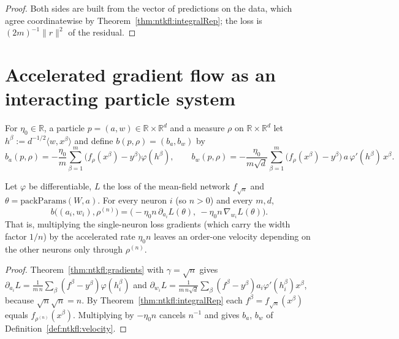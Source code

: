 \begin{proof}
  \leanok
Both sides are built from the vector of predictions on the data, which agree coordinatewise by Theorem~\ref{thm:ntkfl:integralRep}; the loss is $(2m)^{-1}\|r\|^2$ of the residual.
\end{proof}


\section{Accelerated gradient flow as an interacting particle system}\label{sec:ntkfl:particles}

\begin{definition}\label{def:ntkfl:velocity}
  \leanok
For $\eta_0\in\mathbb R$, a particle $p=(a,w)\in\mathbb R\times\mathbb R^d$ and a measure $\rho$ on $\mathbb R\times\mathbb R^d$ let $h^\beta:=d^{-1/2}\langle w,x^\beta\rangle$ and define $b(p,\rho)=(b_a,b_w)$ by
\[
  b_a(p,\rho)=-\frac{\eta_0}{m}\sum_{\beta=1}^m\bigl(f_\rho(x^\beta)-y^\beta\bigr)\varphi(h^\beta),\qquad
  b_w(p,\rho)=-\frac{\eta_0}{m\sqrt d}\sum_{\beta=1}^m\bigl(f_\rho(x^\beta)-y^\beta\bigr)\,a\,\varphi'(h^\beta)\,x^\beta .
\]
\end{definition}

\begin{theorem}\label{thm:ntkfl:cancellation}
  \leanok
Let $\varphi$ be differentiable, $L$ the loss of the mean-field network $f_{\sqrt n}$ and $\theta=\mathrm{packParams}(W,a)$. For every neuron $i$ (so $n>0$) and every $m,d$,
\[
  b\bigl((a_i,w_i),\rho^{(n)}\bigr)=\bigl(-\eta_0n\,\partial_{a_i}L(\theta),\ -\eta_0n\,\nabla_{w_i}L(\theta)\bigr).
\]
That is, multiplying the single-neuron loss gradients (which carry the width factor $1/n$) by the accelerated rate $\eta_0n$ leaves an order-one velocity depending on the other neurons only through $\rho^{(n)}$.
\end{theorem}

\begin{proof}
  \leanok
Theorem~\ref{thm:ntkfl:gradients} with $\gamma=\sqrt n$ gives $\partial_{a_i}L=\frac1{m\,n}\sum_\beta(f^\beta-y^\beta)\varphi(h_i^\beta)$ and $\partial_{w_i}L=\frac1{m\,n\sqrt d}\sum_\beta(f^\beta-y^\beta)a_i\varphi'(h_i^\beta)x^\beta$, because $\sqrt n\sqrt n=n$. By Theorem~\ref{thm:ntkfl:integralRep} each $f^\beta=f_{\sqrt n}(x^\beta)$ equals $f_{\rho^{(n)}}(x^\beta)$. Multiplying by $-\eta_0n$ cancels $n^{-1}$ and gives $b_a$, $b_w$ of Definition~\ref{def:ntkfl:velocity}.
\end{proof}


